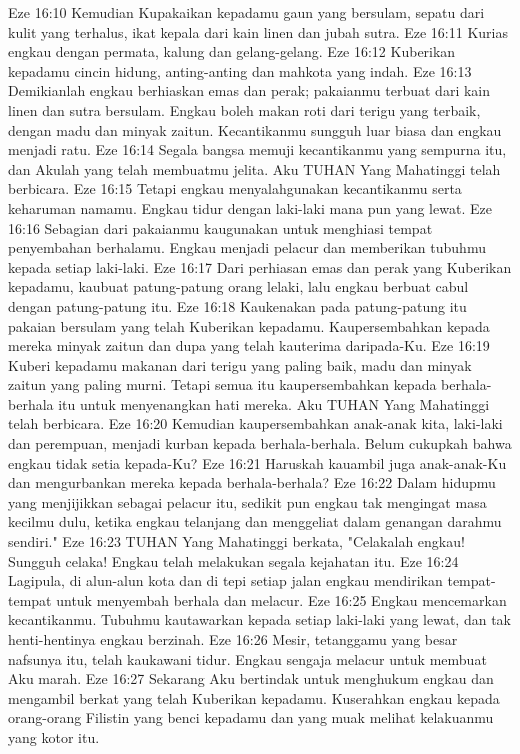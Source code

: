 Eze 16:10  Kemudian Kupakaikan kepadamu gaun yang bersulam, sepatu dari kulit yang terhalus, ikat kepala dari kain linen dan jubah sutra.
Eze 16:11  Kurias engkau dengan permata, kalung dan gelang-gelang.
Eze 16:12  Kuberikan kepadamu cincin hidung, anting-anting dan mahkota yang indah.
Eze 16:13  Demikianlah engkau berhiaskan emas dan perak; pakaianmu terbuat dari kain linen dan sutra bersulam. Engkau boleh makan roti dari terigu yang terbaik, dengan madu dan minyak zaitun. Kecantikanmu sungguh luar biasa dan engkau menjadi ratu.
Eze 16:14  Segala bangsa memuji kecantikanmu yang sempurna itu, dan Akulah yang telah membuatmu jelita. Aku TUHAN Yang Mahatinggi telah berbicara.
Eze 16:15  Tetapi engkau menyalahgunakan kecantikanmu serta keharuman namamu. Engkau tidur dengan laki-laki mana pun yang lewat.
Eze 16:16  Sebagian dari pakaianmu kaugunakan untuk menghiasi tempat penyembahan berhalamu. Engkau menjadi pelacur dan memberikan tubuhmu kepada setiap laki-laki.
Eze 16:17  Dari perhiasan emas dan perak yang Kuberikan kepadamu, kaubuat patung-patung orang lelaki, lalu engkau berbuat cabul dengan patung-patung itu.
Eze 16:18  Kaukenakan pada patung-patung itu pakaian bersulam yang telah Kuberikan kepadamu. Kaupersembahkan kepada mereka minyak zaitun dan dupa yang telah kauterima daripada-Ku.
Eze 16:19  Kuberi kepadamu makanan dari terigu yang paling baik, madu dan minyak zaitun yang paling murni. Tetapi semua itu kaupersembahkan kepada berhala-berhala itu untuk menyenangkan hati mereka. Aku TUHAN Yang Mahatinggi telah berbicara.
Eze 16:20  Kemudian kaupersembahkan anak-anak kita, laki-laki dan perempuan, menjadi kurban kepada berhala-berhala. Belum cukupkah bahwa engkau tidak setia kepada-Ku?
Eze 16:21  Haruskah kauambil juga anak-anak-Ku dan mengurbankan mereka kepada berhala-berhala?
Eze 16:22  Dalam hidupmu yang menjijikkan sebagai pelacur itu, sedikit pun engkau tak mengingat masa kecilmu dulu, ketika engkau telanjang dan menggeliat dalam genangan darahmu sendiri."
Eze 16:23  TUHAN Yang Mahatinggi berkata, "Celakalah engkau! Sungguh celaka! Engkau telah melakukan segala kejahatan itu.
Eze 16:24  Lagipula, di alun-alun kota dan di tepi setiap jalan engkau mendirikan tempat-tempat untuk menyembah berhala dan melacur.
Eze 16:25  Engkau mencemarkan kecantikanmu. Tubuhmu kautawarkan kepada setiap laki-laki yang lewat, dan tak henti-hentinya engkau berzinah.
Eze 16:26  Mesir, tetanggamu yang besar nafsunya itu, telah kaukawani tidur. Engkau sengaja melacur untuk membuat Aku marah.
Eze 16:27  Sekarang Aku bertindak untuk menghukum engkau dan mengambil berkat yang telah Kuberikan kepadamu. Kuserahkan engkau kepada orang-orang Filistin yang benci kepadamu dan yang muak melihat kelakuanmu yang kotor itu.

